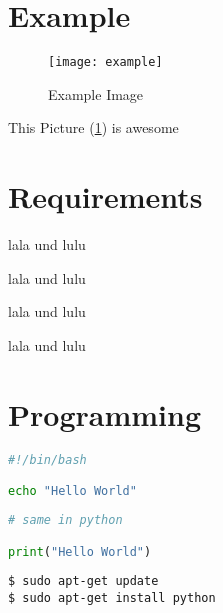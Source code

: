 \section{Example}

\begin{figure}[H]
    \begin{center} 
        \texttt{[image: example]}
        \caption{Example Image}
        \label{fig:example}
    \end{center}
\end{figure}

\cite[vgl. dazu][]{example-book}

This Picture (\ref{fig:example}) is awesome

\cite[vgl. dazu][]{example-online}

\newpage

\section{Requirements}

lala und lulu

lala und lulu

lala und lulu

lala und lulu

\section{Programming}

\begin{lstlisting}[language=Bash]
#!/bin/bash

echo "Hello World"
\end{lstlisting}

\begin{lstlisting}[language=Python]
# same in python

print("Hello World")
\end{lstlisting}

\begin{verbatim}
$ sudo apt-get update
$ sudo apt-get install python
\end{verbatim}
